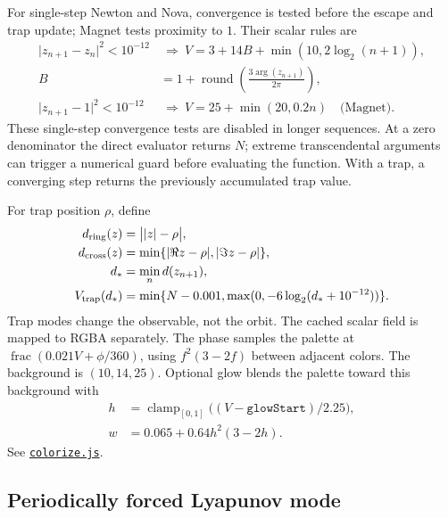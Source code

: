 \documentclass[11pt,a4paper]{article}
\numberwithin{equation}{section}
\newcommand{\abs}[1]{\lvert#1\rvert}
\newcommand{\code}[1]{\texttt{#1}}
\DeclareMathOperator{\clamp}{clamp}
\begin{document}
For single-step Newton and Nova, convergence is tested before the escape
and trap update; Magnet tests proximity to \(1\). Their scalar rules are
\begin{align}
  \abs{z_{n+1}-z_n}^2<10^{-12}
  &\ \Longrightarrow\
  V=3+14B+\min(10,2\log_2(n+1)),\\
  B&=1+\operatorname{round}\left(\frac{3\arg(z_{n+1})}{2\pi}\right),\\
  \abs{z_{n+1}-1}^2<10^{-12}
  &\ \Longrightarrow\
  V=25+\min(20,0.2n)\quad\text{(Magnet)}.
\end{align}
These single-step convergence tests are disabled in longer sequences.
At a zero denominator the direct evaluator returns \(N\); extreme
transcendental arguments can trigger a numerical guard before evaluating
the function. With a trap, a converging step returns the previously
accumulated trap value.

For trap position \(\rho\), define
\begin{align}
  d_{\rm ring}(z)&=\big|\abs z-\rho\big|,\\
  d_{\rm cross}(z)&=\min\{\abs{\Re z-\rho},\abs{\Im z-\rho}\},\\
  d_*&=\min_n d(z_{n+1}),\\
  V_{\rm trap}(d_*)&=\min\{N-0.001,\max(0,-6\log_2(d_*+10^{-12}))\}.
\end{align}
Trap modes change the observable, not the orbit. The cached scalar field
is mapped to RGBA separately. The phase samples the palette at
\(\operatorname{frac}(0.021V+\phi/360)\), using
\(f^2(3-2f)\) between adjacent colors. The background is \((10,14,25)\).
Optional glow blends the palette toward this background with
\begin{align*}
  h&=\clamp_{[0,1]}\big((V-\texttt{glowStart})/2.25\big),\\
  w&=0.065+0.64h^2(3-2h).
\end{align*}
See \href{../dist/colorize.js}{\code{colorize.js}}.

\subsection{Periodically forced Lyapunov mode}
\end{document}
